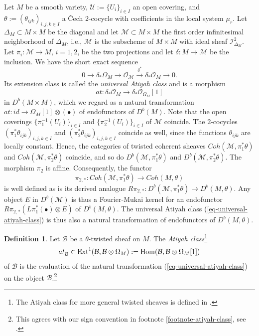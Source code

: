 \documentclass[12pt]{amsart}
\numberwithin{equation}{subsection}
\theoremstyle{plain}
\theoremstyle{definition}
\newtheorem{defi}[thm]{Definition}
\newcommand{\B}{{\mathcal B}}
\newcommand{\M}{{\mathcal M}}
\newcommand{\U}{{\mathcal U}}
\newcommand{\RightArrowOf}[1]{\stackrel{#1}{\rightarrow}}
\newcommand{\StructureSheaf}[1]{{\mathcal O}_{#1}}
\newcommand{\Ext}{{\rm Ext}}
\newcommand{\Hom}{{\rm Hom}}
\newcommand{\Ideal}[1]{{\mathcal I}_{#1}}
\begin{document}
Let $M$ be a smooth variety, $\U:=\{U_i\}_{i\in I}$ an open covering, and $\theta:=(\theta_{ijk})_{i,j,k\in I}$ a \v{C}ech $2$-cocycle with coefficients in the local system $\mu_r$. Let $\Delta_M\subset M\times M$ be the diagonal and let $\M\subset M\times M$ the first order infinitesimal neighborhood of $\Delta_M$, i.e., $\M$ is the subscheme of $M\times M$ with ideal sheaf $\Ideal{\Delta_M}^2$. Let $\pi_i:\M\rightarrow M$, $i=1,2$, be the two projections and let $\delta:M\rightarrow \M$ be the inclusion. We have the short exact sequence
\begin{equation}
\label{eq-short-exact-sequence-of-structure-sheaf-of-first-order-neighborhood}
0\rightarrow \delta_*\Omega_M\rightarrow \StructureSheaf{\M}\RightArrowOf{\delta^*}\delta_*\StructureSheaf{M}\rightarrow 0.
\end{equation}
Its extension class is called the {\em universal Atiyah class} and is 
a morphism 
\begin{equation}
\label{eq-universal-atiyah-class}
at:\delta_*\StructureSheaf{M}\rightarrow \delta_*\StructureSheaf{\Omega_M}[1]
\end{equation} 
in $D^b(M\times M)$, which we regard as a natural transformation $at:id\rightarrow \Omega_M[1]\otimes(\bullet)$ of endofunctors of $D^b(M)$.
Note that the open coverings
$\{\pi_1^{-1}(U_i)\}_{i\in I}$ and $\{\pi_2^{-1}(U_i)\}_{i\in I}$ of $\M$ coincide. The $2$-cocycles $(\pi_1^*\theta_{ijk})_{i,j,k\in I}$ and 
$(\pi_2^*\theta_{ijk})_{i,j,k\in I}$ coincide as well, since the functions $\theta_{ijk}$ are locally constant. Hence, 
the categories of twisted coherent sheaves $Coh(\M,\pi_1^*\theta)$ and $Coh(\M,\pi_2^*\theta)$ coincide, and so do 
$D^b(\M,\pi_1^*\theta)$ and $D^b(\M,\pi_2^*\theta)$. The morphism $\pi_2$ is affine. Consequently, the functor
\[
\pi_{2,*}:Coh(\M,\pi_1^*\theta)\rightarrow Coh(M,\theta)
\]
is well defined as is its derived analogue $R\pi_{2,*}:D^b(\M,\pi_1^*\theta)\rightarrow D^b(M,\theta)$. Any object $E$ in $D^b(\M)$ is thus a Fourier-Mukai kernel for an endofunctor $R\pi_{2,*}(L\pi_1^*(\bullet)\otimes E)$ of $D^b(M,\theta)$. The universal Atiyah class (\ref{eq-universal-atiyah-class}) is thus also a natural transformation of endofunctors of $D^b(M,\theta)$.

\begin{defi}
\label{def-atiyah-class-of-twisted-sheaf}
Let $\B$ be a $\theta$-twisted sheaf on $M$. 
\label{def-jet-bundle-of-mu-r-twisted-sheaf}
The {\em Atiyah class}\footnote{The Atiyah class for more general twisted sheaves is defined in \cite[Sec. 6.5.1]{lieblich}.}  
\[
at_\B^{}\in\Ext^1(\B,\B\otimes \Omega_M):= \Hom(\B,\B\otimes \Omega_M[1])
\] 
of $\B$ is 
the evaluation of the natural transformation (\ref{eq-universal-atiyah-class}) on the object $\B$.\footnote{This agrees with our sign convention in footnote \ref{footnote-atiyah-class}, see \cite[Theorem 5]{atiyah}.} 
\end{defi}
\end{document}
